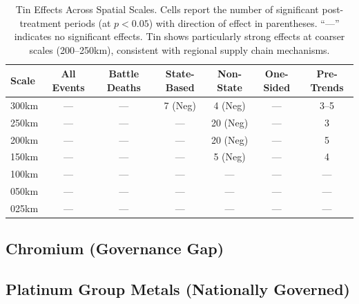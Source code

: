 \documentclass[11pt]{article}
\begin{document}
\begin{table}[H]
\centering
\caption{Tin Effects Across Spatial Scales. Cells report the number of significant post-treatment periods (at $p<0.05$) with direction of effect in parentheses. ``---'' indicates no significant effects. Tin shows particularly strong effects at coarser scales (200--250km), consistent with regional supply chain mechanisms.}
\label{tab:tin_robustness}
\begin{tabular}{lcccccc}
\toprule
Scale & All Events & Battle Deaths & State-Based & Non-State & One-Sided & Pre-Trends \\
\midrule
300km & ---       & ---           & 7 (Neg)     & 4 (Neg)   & ---       & 3--5       \\
250km & ---       & ---           & ---         & 20 (Neg)  & ---       & 3          \\
200km & ---       & ---           & ---         & 20 (Neg)  & ---       & 5          \\
150km & ---       & ---           & ---         & 5 (Neg)   & ---       & 4          \\
100km & ---       & ---           & ---         & ---       & ---       & ---        \\
050km & ---       & ---           & ---         & ---       & ---       & ---        \\
025km & ---       & ---           & ---         & ---       & ---       & ---        \\
\bottomrule
\end{tabular}
\end{table}

\subsection{Chromium (Governance Gap)}








\subsection{Platinum Group Metals (Nationally Governed)}
\end{document}
